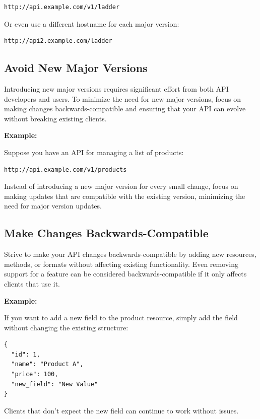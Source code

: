 \documentclass{article}
\begin{document}
\begin{verbatim}
http://api.example.com/v1/ladder
\end{verbatim}

Or even use a different hostname for each major version:

\begin{verbatim}
http://api2.example.com/ladder
\end{verbatim}

\subsection{Avoid New Major Versions}

Introducing new major versions requires significant effort from both API developers and users. To minimize the need for new major versions, focus on making changes backwards-compatible and ensuring that your API can evolve without breaking existing clients.

\textbf{Example:}

Suppose you have an API for managing a list of products:

\begin{verbatim}
http://api.example.com/v1/products
\end{verbatim}

Instead of introducing a new major version for every small change, focus on making updates that are compatible with the existing version, minimizing the need for major version updates.

\subsection{Make Changes Backwards-Compatible}

Strive to make your API changes backwards-compatible by adding new resources, methods, or formats without affecting existing functionality. Even removing support for a feature can be considered backwards-compatible if it only affects clients that use it.

\textbf{Example:}

If you want to add a new field to the product resource, simply add the field without changing the existing structure:

\begin{verbatim}
{
  "id": 1,
  "name": "Product A",
  "price": 100,
  "new_field": "New Value"
}
\end{verbatim}

Clients that don't expect the new field can continue to work without issues.
\end{document}

